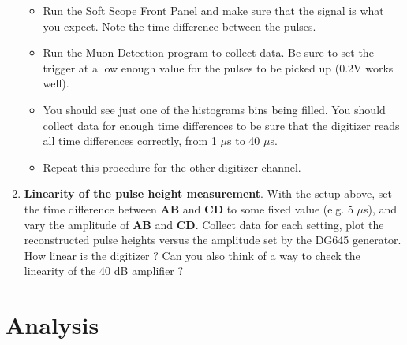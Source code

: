 \documentclass{../lab}
\begin{document}
\begin{enumerate}
\begin{itemize}
        \item Run the Soft Scope Front Panel and make sure that the signal is what you expect. Note the time difference between the pulses.

        \item Run the Muon Detection program to collect data. Be sure to set the trigger at a low enough value for the pulses to be picked up (0.2V works well).

        \item You should see just one of the histograms bins being filled. You should collect data for enough time differences to be sure that the digitizer reads all time differences correctly, from 1 $\mu$s to 40 $\mu$s.

        \item Repeat this procedure for the other digitizer channel.

    \end{itemize}

    \item \textbf{Linearity of the pulse height measurement}. With the setup above, set the time difference between \textbf{AB} and \textbf{CD} to some fixed value (e.g. 5 $ \mu $s), and vary the amplitude of \textbf{AB} and \textbf{CD}. Collect data for each setting, plot the reconstructed pulse heights versus the amplitude set by the DG645 generator. How linear is the digitizer ? Can you also think of a way to check the linearity of the 40 dB amplifier ?

\end{enumerate}

\section{Analysis}
\end{document}
